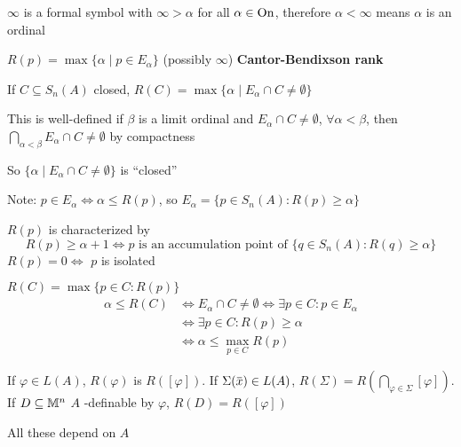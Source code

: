 \documentclass[11pt]{article}
\begin{document}
\begin{remark}
\(\infty\) is a formal symbol with \(\infty>\alpha\) for all \(\alpha\in\operatorname{On}\), therefore \(\alpha<\infty\) means \(\alpha\) is an ordinal
\end{remark}

\begin{definition}[]
\(R(p)=\max\{\alpha\mid p\in E_\alpha\}\) (possibly \(\infty\)) \textbf{Cantor-Bendixson rank}

If \(C\subseteq S_n(A)\) closed, \(R(C)=\max\{\alpha\mid E_\alpha\cap C\neq\emptyset\}\)
\end{definition}

This is well-defined if \(\beta\) is a limit ordinal and \(E_\alpha\cap C\neq\emptyset\), \(\forall\alpha<\beta\),
then \(\bigcap_{\alpha<\beta} E_\alpha\cap C\neq\emptyset\) by compactness

So \(\{\alpha\mid E_\alpha\cap C\neq\emptyset\}\) is ``closed''

Note: \(p\in E_\alpha\Leftrightarrow\alpha\le R(p)\), so \(E_\alpha=\{p\in S_n(A):R(p)\ge\alpha\}\)

\begin{remark}
\(R(p)\) is characterized by
\begin{equation*}
R(p)\ge\alpha+1\Leftrightarrow p\text{ is an accumulation point of }\{q\in S_n(A):R(q)\ge\alpha\}
\end{equation*}
\(R(p)=0\Leftrightarrow\) \(p\) is isolated
\end{remark}

\begin{remark}
\(R(C)=\max\{p\in C:R(p)\}\)
\begin{align*}
\alpha\le R(C)&\Leftrightarrow E_\alpha\cap C\neq\emptyset\Leftrightarrow\exists p\in C:p\in E_\alpha\\
&\Leftrightarrow\exists p\in C:R(p)\ge\alpha\\
&\Leftrightarrow\alpha\le\max_{p\in C}R(p)
\end{align*}
\end{remark}

\begin{definition}[]
If \(\varphi\in L(A)\), \(R(\varphi)\) is \(R([\varphi])\). If \(\Sigma(\barx)\in L(A)\), \(R(\Sigma)=R(\bigcap_{\varphi\in\Sigma}[\varphi])\). If
\(D\subseteq\mathbb{M}^n\) \(A\) -definable by \(\varphi\), \(R(D)=R([\varphi])\)

All these depend on \(A\)
\end{definition}
\end{document}
